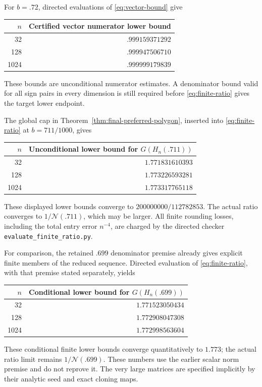 \documentclass[11pt]{article}
\newcommand{\N}{\mathcal N}
\begin{document}
For $b=.72$, directed evaluations of \eqref{eq:vector-bound} give
\begin{center}\small
\begin{tabular}{rr}
$n$ & Certified vector numerator lower bound\\\hline
32 & $.999159371292$\\
128 & $.999947506710$\\
1024 & $.999999179839$\\\hline
\end{tabular}
\end{center}
These bounds are unconditional numerator estimates. A denominator bound
valid for all sign pairs in every dimension is still required before
\eqref{eq:finite-ratio} gives the target lower endpoint.

The global cap in Theorem~\ref{thm:final-preferred-polygon}, inserted
into \eqref{eq:finite-ratio} at $b=711/1000$, gives
\begin{center}\small
\begin{tabular}{rr}
$n$ & Unconditional lower bound for $G(H_n(.711))$\\\hline
32 & $1.771831610393$\\
128 & $1.773226593281$\\
1024 & $1.773317765118$\\\hline
\end{tabular}
\end{center}
These displayed lower bounds converge to $200000000/112782853$.
The actual ratio converges to $1/\N(.711)$, which may be larger.
All finite rounding losses, including the total entry error $n^{-4}$,
are charged by the directed checker
\texttt{evaluate\_\allowbreak finite\_\allowbreak ratio.py}.

For comparison, the retained $.699$ denominator premise already gives
explicit finite members of the reduced sequence. Directed evaluation of
\eqref{eq:finite-ratio}, with that premise stated separately, yields
\begin{center}\small
\begin{tabular}{rr}
$n$ & Conditional lower bound for $G(H_n(.699))$\\\hline
32 & $1.771523050434$\\
128 & $1.772908047308$\\
1024 & $1.772998563604$\\\hline
\end{tabular}
\end{center}
These conditional finite lower bounds converge quantitatively to
$1.773$; the actual ratio limit remains $1/\N(.699)$. These numbers
use the earlier scalar norm premise and do not reprove it. The very large matrices are specified implicitly
by their analytic seed and exact cloning maps.
\end{document}
